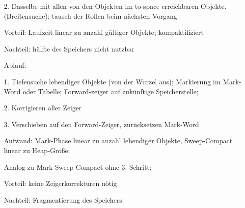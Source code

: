 2. Dasselbe mit allen von den Objekten im to-space erreichbaren Objekte. (Breitensuche); tausch der Rollen beim nächsten Vorgang

Vorteil: Laufzeit linear zu anzahl gültiger Objekte; kompaktifiziert

Nachteil: hälfte des Speichers nicht nutzbar

Ablauf: 

1. Tiefensuche lebendiger Objekte (von der Wurzel aus); Markierung im Mark-Word oder Tabelle; Forward-zeiger auf zukünftige Speicherstelle;

2. Korrigieren aller Zeiger

3. Verschieben auf den Forward-Zeiger, zurücksetzen Mark-Word 

Aufwand: Mark-Phase linear zu anzahl lebendiger Objekte, Sweep-Compact linear zu Heap-Größe;

Analog zu Mark-Sweep Compact ohne 3. Schritt; 

Vorteil: keine Zeigerkorrekturen nötig

Nachteil: Fragmentierung des Speichers
